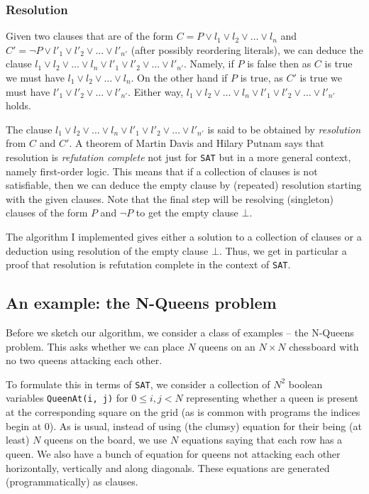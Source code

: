 \hypertarget{resolution}{%
\subsubsection{Resolution}\label{resolution}}

Given two clauses that are of the form
\(C = P\vee l_1\vee l_2\vee \dots\vee l_n\) and
\(C' = \neg P\vee l'_1\vee l'_2\vee \dots\vee l'_{n'}\) (after possibly
reordering literals), we can deduce the clause
\(l_1\vee l_2\vee \dots\vee l_n\vee l'_1\vee l'_2\vee \dots\vee l'_{n'}\).
Namely, if \(P\) is false then as \(C\) is true we must have
\(l_1\vee l_2\vee \dots\vee l_n\). On the other hand if \(P\) is true,
as \(C'\) is true we must have \(l'_1\vee l'_2\vee \dots\vee l'_{n'}\).
Either way,
\(l_1\vee l_2\vee \dots\vee l_n\vee l'_1\vee l'_2\vee \dots\vee l'_{n'}\)
holds.

The clause
\(l_1\vee l_2\vee \dots\vee l_n\vee l'_1\vee l'_2\vee \dots\vee l'_{n'}\)
is said to be obtained by \emph{resolution} from \(C\) and \(C'\). A
theorem of Martin Davis and Hilary Putnam says that resolution is
\emph{refutation complete} not just for \texttt{SAT} but in a more
general context, namely first-order logic. This means that if a
collection of clauses is not satisfiable, then we can deduce the empty
clause by (repeated) resolution starting with the given clauses. Note
that the final step will be resolving (singleton) clauses of the form
\(P\) and \(\neg P\) to get the empty clause \(\bot\).

The algorithm I implemented gives either a solution to a collection of
clauses or a deduction using resolution of the empty clause \(\bot\).
Thus, we get in particular a proof that resolution is refutation
complete in the context of \texttt{SAT}.

\hypertarget{an-example-the-n-queens-problem}{%
\subsection{An example: the N-Queens
problem}\label{an-example-the-n-queens-problem}}

Before we sketch our algorithm, we consider a class of examples -- the
N-Queens problem. This asks whether we can place \(N\) queens on an
\(N\times N\) chessboard with no two queens attacking each other.

To formulate this in terms of \texttt{SAT}, we consider a collection of
\(N^2\) boolean variables \texttt{QueenAt(i,\ j)} for
\(0 \leq i, j < N\) representing whether a queen is present at the
corresponding square on the grid (as is common with programs the indices
begin at \(0\)). As is usual, instead of using (the clumsy) equation for
their being (at least) \(N\) queens on the board, we use \(N\) equations
saying that each row has a queen. We also have a bunch of equation for
queens not attacking each other horizontally, vertically and along
diagonals. These equations are generated (programmatically) as clauses.

